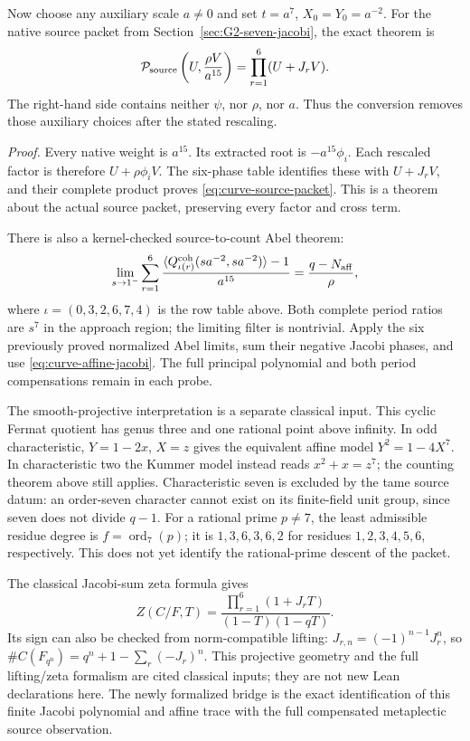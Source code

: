 \documentclass[11pt]{article}
\begin{document}
Now choose any auxiliary scale $a\ne0$ and set
$t=a^7$, $X_0=Y_0=a^{-2}$. For the native source packet from
Section~\ref{sec:G2-seven-jacobi}, the exact theorem is
\begin{equation}
 {\cal P}_{\rm source}\left(U,\frac{\rho V}{a^{15}}\right)
   =\prod_{r=1}^6(U+J_rV).
 \label{eq:curve-source-packet}
\end{equation}
The right-hand side contains neither $\psi$, nor $\rho$, nor $a$.
Thus the conversion removes those auxiliary choices after the
stated rescaling.

\emph{Proof.} Every native weight is $a^{15}$. Its extracted
root is $-a^{15}\phi_i$. Each rescaled factor is therefore
$U+\rho\phi_iV$. The six-phase table identifies these with
$U+J_rV$, and their complete product proves
\eqref{eq:curve-source-packet}. This is a theorem about the
actual source packet, preserving every factor and cross term.

There is also a kernel-checked source-to-count Abel theorem:
\begin{equation}
 \lim_{s\to1^-}\sum_{r=1}^6
 \frac{\langle Q_{\iota(r)}^{\rm coh}(sa^{-2},sa^{-2})\rangle-1}
      {a^{15}}
 =\frac{q-N_{\rm aff}}{\rho},
 \label{eq:curve-source-trace}
\end{equation}
where $\iota=(0,3,2,6,7,4)$ is the row table above.
Both complete period ratios are $s^7$ in the approach region;
the limiting filter is nontrivial. Apply the six previously
proved normalized Abel limits, sum their negative Jacobi phases,
and use \eqref{eq:curve-affine-jacobi}. The full principal
polynomial and both period compensations remain in each probe.

The smooth-projective interpretation is a separate classical
input. This cyclic Fermat quotient has genus three and one
rational point above infinity. In odd characteristic,
$Y=1-2x$, $X=z$ gives the equivalent affine model
$Y^2=1-4X^7$. In characteristic two the Kummer model instead
reads $x^2+x=z^7$; the counting theorem above still applies.
Characteristic seven is excluded by the tame source datum:
an order-seven character cannot exist on its finite-field unit
group, since seven does not divide $q-1$.
For a rational prime $p\ne7$, the least admissible residue degree
is $f=\operatorname{ord}_7(p)$; it is $1,3,6,3,6,2$ for residues
$1,2,3,4,5,6$, respectively. This does not yet identify the
rational-prime descent of the packet.

The classical Jacobi-sum zeta formula
\cite[Introduction, equation (2)]{AokiQuotients} gives
\[
 Z(C/F,T)=
 \frac{\prod_{r=1}^6(1+J_rT)}{(1-T)(1-qT)} .
\]
Its sign can also be checked from norm-compatible lifting:
$J_{r,n}=(-1)^{n-1}J_r^n$, so
$\#C(F_{q^n})=q^n+1-\sum_r(-J_r)^n$.
This projective geometry and the full lifting/zeta formalism
are cited classical inputs; they are not new Lean declarations
here. The newly formalized bridge is the exact identification
of this finite Jacobi polynomial and affine trace with the full
compensated metaplectic source observation.
\end{document}
